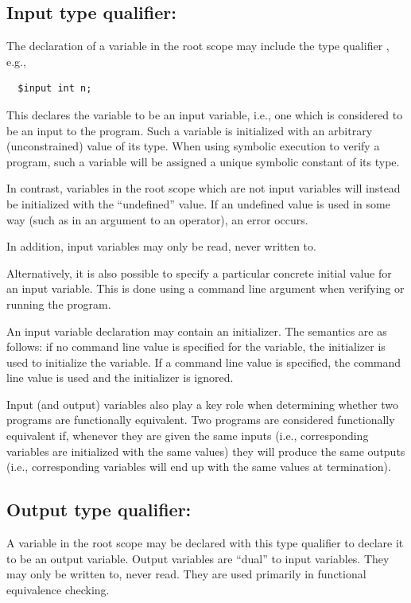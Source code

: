 \subsection{Input type qualifier: \cinput}

The declaration of a variable in the root scope may
include the type qualifier \cinput, e.g.,
\begin{verbatim}
  $input int n;
\end{verbatim}
This declares the variable to be an input variable, i.e., one which is
considered to be an input to the program.  Such a variable is
initialized with an arbitrary (unconstrained) value of its type.  When
using symbolic execution to verify a program, such a variable will be
assigned a unique symbolic constant of its type.

In contrast, variables in the root scope which are not input variables
will instead be initialized with the ``undefined'' value.  If an
undefined value is used in some way (such as in an argument to an
operator), an error occurs.

In addition, input variables may only be read, never written to.

Alternatively, it is also possible to specify a particular concrete
initial value for an input variable.  This is done using a command
line argument when verifying or running the program.

An input variable declaration may contain an initializer.  The
semantics are as follows: if no command line value is specified for
the variable, the initializer is used to initialize the variable.  If
a command line value is specified, the command line value is used and
the initializer is ignored.

Input (and output) variables also play a key role when determining
whether two programs are functionally equivalent.  Two programs are
considered functionally equivalent if, whenever they are given the
same inputs (i.e., corresponding \cinput{} variables are initialized
with the same values) they will produce the same outputs (i.e.,
corresponding \coutput{} variables will end up with the same values at
termination).

\subsection{Output type qualifier: \coutput}

A variable in the root scope may be declared with this type qualifier
to declare it to be an output variable.  Output variables are ``dual''
to input variables.  They may only be written to, never read.  They
are used primarily in functional equivalence checking.

